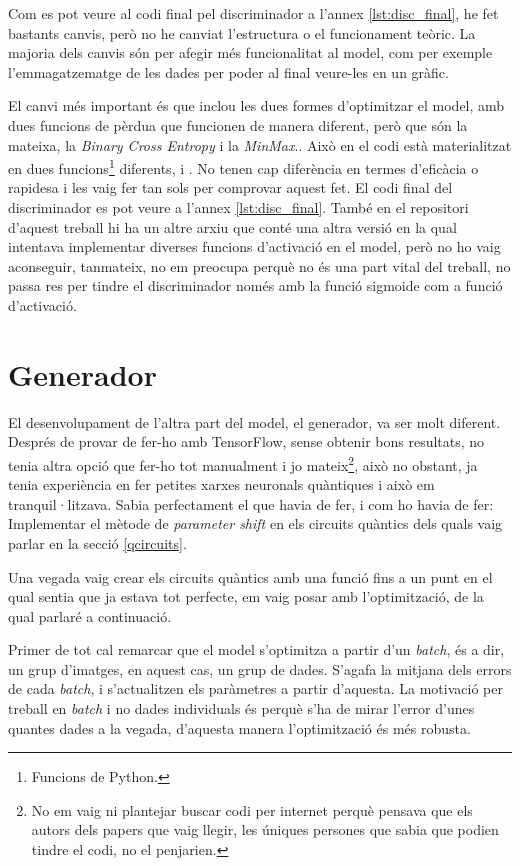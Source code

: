 Com es pot veure al codi final pel discriminador a l'annex \ref{lst:disc_final}, he fet bastants canvis, però no he canviat l'estructura o el funcionament teòric. La majoria dels canvis són per afegir més funcionalitat al model, com per exemple l'emmagatzematge de les dades per poder al final veure-les en un gràfic.

El canvi més important és que inclou les dues formes d'optimitzar el model, amb dues funcions de pèrdua que funcionen de manera diferent, però que són la mateixa, la \textit{Binary Cross Entropy} i la \textit{MinMax}.. Això en el codi està materialitzat en dues funcions\footnote{Funcions de Python.} diferents,  i . No tenen cap diferència en termes d'eficàcia o rapidesa i les vaig fer tan sols per comprovar aquest fet. El codi final del discriminador es pot veure a l'annex \ref{lst:disc_final}. També en el repositori d'aquest treball hi ha un altre arxiu que conté una altra versió en la qual intentava implementar diverses funcions d'activació en el model, però no ho vaig aconseguir, tanmateix, no em preocupa perquè no és una part vital del treball, no passa res per tindre el discriminador només amb la funció sigmoide com a funció d'activació.

\section{Generador}

El desenvolupament de l'altra part del model, el generador, va ser molt diferent. Després de provar de fer-ho amb TensorFlow, sense obtenir bons resultats, no tenia altra opció que fer-ho tot manualment i jo mateix\footnote{No em vaig ni plantejar buscar codi per internet perquè pensava que els autors dels papers que vaig llegir, les úniques persones que sabia que podien tindre el codi, no el penjarien.}, això no obstant, ja tenia experiència en fer petites xarxes neuronals quàntiques i això em tranquil·litzava. Sabia perfectament el que havia de fer, i com ho havia de fer: Implementar el mètode de \textit{parameter shift} en els circuits quàntics dels quals vaig parlar en la secció \ref{qcircuits}.

Una vegada vaig crear els circuits quàntics amb una funció fins a un punt en el qual sentia que ja estava tot perfecte, em vaig posar amb l'optimització, de la qual parlaré a continuació.

Primer de tot cal remarcar que el model s'optimitza a partir d'un \textit{batch}, és a dir, un grup d'imatges, en aquest cas, un grup de dades. S'agafa la mitjana dels errors de cada \textit{batch}, i s'actualitzen els paràmetres a partir d'aquesta. La motivació per treball en \textit{batch} i no dades individuals és perquè s'ha de mirar l'error d'unes quantes dades a la vegada, d'aquesta manera l'optimització és més robusta.

